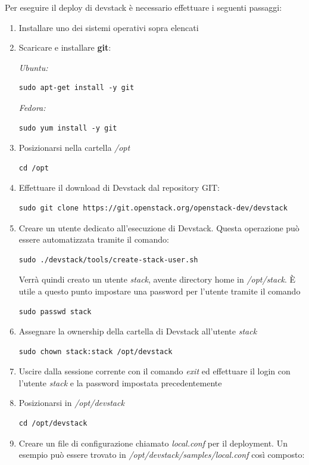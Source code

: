 \documentclass[../main.tex]{subfiles}
\begin{document}
Per eseguire il deploy di devstack è necessario effettuare i seguenti passaggi:
\begin{enumerate}
\item Installare uno dei sistemi operativi sopra elencati
\item Scaricare e installare \textbf{git}:

\textit{Ubuntu:}
\begin{Verbatim}
sudo apt-get install -y git 
\end{Verbatim}
\textit{Fedora:}
\begin{Verbatim}
sudo yum install -y git
\end{Verbatim}
\item Posizionarsi nella cartella \textit{/opt}
\begin{verbatim}
cd /opt
\end{verbatim}
\item Effettuare il download di Devstack dal repository GIT:
\begin{Verbatim}
sudo git clone https://git.openstack.org/openstack-dev/devstack
\end{Verbatim}
\item Creare un utente dedicato all'esecuzione di Devstack. Questa operazione può essere automatizzata tramite il comando:
\begin{Verbatim}
sudo ./devstack/tools/create-stack-user.sh
\end{Verbatim}
Verrà quindi creato un utente \textit{stack}, avente directory home in \textit{/opt/stack}. \`E utile a questo punto impostare una password per l'utente tramite il comando
\begin{verbatim}
sudo passwd stack
\end{verbatim}
\item Assegnare la ownership della cartella di Devstack all'utente \textit{stack}
\begin{verbatim}
sudo chown stack:stack /opt/devstack
\end{verbatim}
\item Uscire dalla sessione corrente con il comando \textit{exit} ed effettuare il login con l'utente \textit{stack} e la password impostata precedentemente
\item Posizionarsi in \textit{/opt/devstack}
\begin{verbatim}
cd /opt/devstack
\end{verbatim}
\item Creare un file di configurazione chiamato \textit{local.conf} per il deployment. Un esempio può essere trovato in \textit{/opt/devstack/samples/local.conf} così composto:

\end{enumerate}
\end{document}
